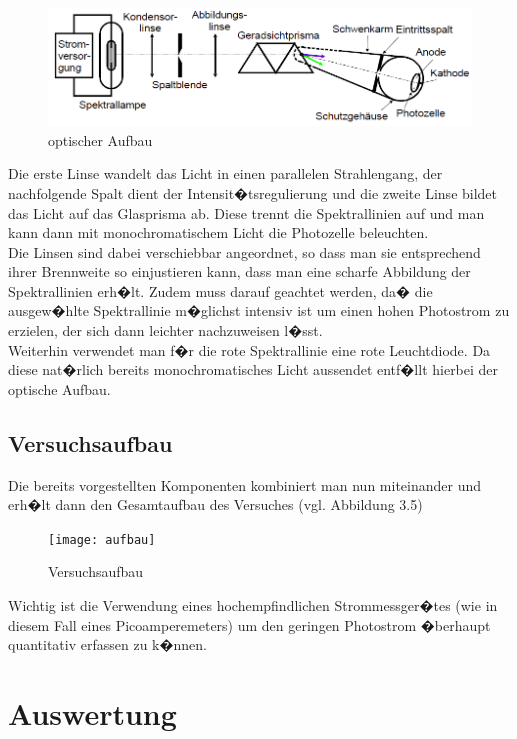 \documentclass[a4paper, 10pt]{report}%
\begin{document}
\begin{figure}[!htbp]
	\begin{center}
		\includegraphics[scale = 0.4]{optisch}
	\end{center}
	\caption{optischer Aufbau}
	\label{fig:abbildung4}
\end{figure}

Die erste Linse wandelt das Licht in einen parallelen Strahlengang, der nachfolgende Spalt dient der Intensit�tsregulierung und die zweite Linse bildet das Licht auf das Glasprisma ab. Diese trennt die Spektrallinien auf und man kann dann mit monochromatischem Licht die Photozelle beleuchten.\\
Die Linsen sind dabei verschiebbar angeordnet, so dass man sie entsprechend ihrer Brennweite so einjustieren kann, dass man eine scharfe Abbildung der Spektrallinien erh�lt. Zudem muss darauf geachtet werden, da� die ausgew�hlte Spektrallinie m�glichst intensiv ist um einen hohen Photostrom zu erzielen, der sich dann leichter nachzuweisen l�sst.\\
Weiterhin verwendet man f�r die rote Spektrallinie eine rote Leuchtdiode. Da diese nat�rlich bereits monochromatisches Licht aussendet entf�llt hierbei der optische Aufbau.
\section{Versuchsaufbau}
Die bereits vorgestellten Komponenten kombiniert man nun miteinander und erh�lt dann den Gesamtaufbau des Versuches (vgl. Abbildung 3.5)
\begin{figure}[!htbp]
	\begin{center}
		\texttt{[image: aufbau]}
	\end{center}
	\caption{Versuchsaufbau}
	\label{fig:abbildung1}
\end{figure}
Wichtig ist die Verwendung eines hochempfindlichen Strommessger�tes (wie in diesem Fall eines Picoamperemeters) um den geringen Photostrom �berhaupt quantitativ erfassen zu k�nnen.

\chapter{Auswertung}
\end{document}

